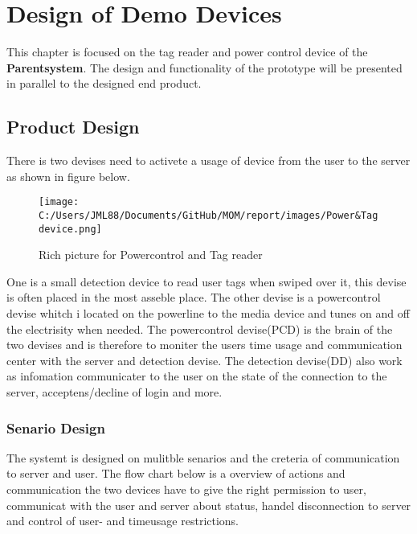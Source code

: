 \chapter{Design of Demo Devices}
This chapter is focused on the tag reader and power control device of the \textbf{Parentsystem}. 
The design and functionality of the prototype will be presented in parallel to the designed end product.

\section{Product Design}

There is two devises need to activete a usage of device from the user to the server as shown in figure below.



\begin{figure}[h]
	\centering
		\texttt{[image: C:/Users/JML88/Documents/GitHub/MOM/report/images/Power\&Tagdevice.png]}
	\caption{Rich picture for Powercontrol and Tag reader}
	\label{fig:Power&Tagdevice}
\end{figure}



One is a small detection device to read user tags when swiped over it, this devise is often placed in the most asseble place. 
The other devise is a powercontrol devise whitch i located on the powerline to the media device and tunes on and off the electrisity when needed.
The powercontrol devise(PCD) is the brain of the two devises and is therefore to moniter the users time usage and communication center with the server and detection devise. 
The detection devise(DD) also work as infomation communicater to the user on the state of the connection to the server, acceptens/decline of login and more.     

\subsection{Senario Design}

The systemt is designed on mulitble senarios and the creteria of communication to server and user. The flow chart below is a overview of actions and communication the two devices have to give the right permission to user, communicat with the user and server about status, handel disconnection to server and control of user- and timeusage restrictions.


